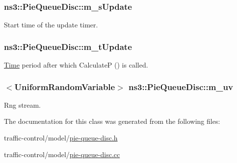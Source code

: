 \subsubsection[{\texorpdfstring{m\+\_\+s\+Update}{m_sUpdate}}]{ ns3\+::\+Pie\+Queue\+Disc\+::m\+\_\+s\+Update\hspace{0.3cm}{\ttfamily [private]}}\hypertarget{classns3_1_1PieQueueDisc_a25258274d61df8126b68fae4398a0918}{}\label{classns3_1_1PieQueueDisc_a25258274d61df8126b68fae4398a0918}


Start time of the update timer. 

\subsubsection[{\texorpdfstring{m\+\_\+t\+Update}{m_tUpdate}}]{ ns3\+::\+Pie\+Queue\+Disc\+::m\+\_\+t\+Update\hspace{0.3cm}{\ttfamily [private]}}\hypertarget{classns3_1_1PieQueueDisc_abf2ddf0a8be15f28fab235144118b06c}{}\label{classns3_1_1PieQueueDisc_abf2ddf0a8be15f28fab235144118b06c}


\hyperlink{classns3_1_1Time}{Time} period after which CalculateP () is called. 

\subsubsection[{\texorpdfstring{m\+\_\+uv}{m_uv}}]{$<${\bf Uniform\+Random\+Variable}$>$ ns3\+::\+Pie\+Queue\+Disc\+::m\+\_\+uv\hspace{0.3cm}{\ttfamily [private]}}\hypertarget{classns3_1_1PieQueueDisc_abcef525d0e61ee838769b2dc714f232a}{}\label{classns3_1_1PieQueueDisc_abcef525d0e61ee838769b2dc714f232a}


Rng stream. 



The documentation for this class was generated from the following files\+:\begin{DoxyCompactItemize}
\item 
traffic-\/control/model/\hyperlink{pie-queue-disc_8h}{pie-\/queue-\/disc.\+h}\item 
traffic-\/control/model/\hyperlink{pie-queue-disc_8cc}{pie-\/queue-\/disc.\+cc}\end{DoxyCompactItemize}
